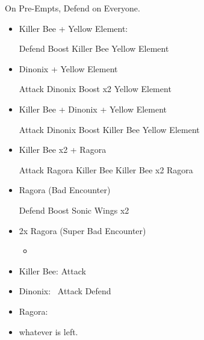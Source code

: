 \bothvfill\winvfill\lossvfill
\begin{encounters}
	On Pre-Empts, Defend on Everyone.
	\begin{itemize}
		\item Killer Bee + Yellow Element:
		      \begin{itemize}
			      \tidusf Defend
			      \summon{\valefor}
			      \valeforf Boost
			      \valeforf \thunder Killer Bee
		            \valeforf \water Yellow Element
		      \end{itemize}
		\item Dinonix + Yellow Element
		      \begin{itemize}
			      \tidusf Attack Dinonix
			      \summon{\valefor}
			      \valeforf Boost x2
			      \valeforf \water Yellow Element
		      \end{itemize}
		\item Killer Bee + Dinonix + Yellow Element
		      \begin{itemize}
			      \tidusf Attack Dinonix
			      \summon{\valefor}
			      \valeforf Boost
			      \valeforf \thunder Killer Bee
			      \valeforf \water Yellow Element
		      \end{itemize}
		\item Killer Bee x2 + Ragora
			\begin{itemize}
				\tidusf Attack Ragora
				\summon{\valefor}
				\valeforf \thunder Killer Bee
				\valeforf \thunder Killer Bee
				\valeforf \fire x2 Ragora
			\end{itemize}
		\item Ragora (Bad Encounter)
		      \begin{itemize}
			      \tidusf Defend
			      \summon{\valefor}
			      \valeforf Boost
			      \valeforf Sonic Wings
			      \valeforf \fire x2
		      \end{itemize}
		\item 2x Ragora (Super Bad Encounter)
		      \begin{itemize}
			      \tidusf Defend
			      \summon{\valefor}
			      \valeforf Boost
			      \valeforf Dismiss
			      \wakkaf Defend
			      \item \flee
		      \end{itemize}
	\end{itemize}
\end{encounters}
\begin{encounters}
	\begin{itemize}
		\item Killer Bee: \wakka Attack
		\item Dinonix: \tidus\ Attack
		 \yunaf Defend
		\item Ragora: \flee
		\item \flee whatever is left.
	\end{itemize}
\end{encounters}
